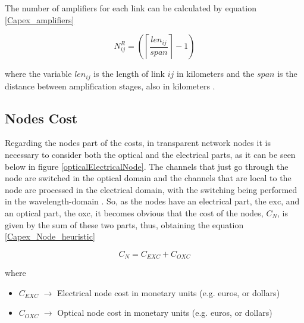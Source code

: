 \vspace{11pt}
The number of amplifiers for each link can be calculated by equation \ref{Capex_amplifiers}

\begin{equation}
N^R_{ij} = \left(\left\lceil\frac{len_{ij}}{span}\right\rceil-1\right)
\label{Capex_amplifiers}
\end{equation}

\vspace{11pt}
\noindent
where the variable $len_{ij}$ is the length of link $ij$ in kilometers and the $span$ is the distance between amplification stages, also in kilometers \cite{anpinto2}.


\subsection{Nodes Cost}
\label{nodesCost_}

Regarding the nodes part of the costs, in transparent network nodes it is necessary to consider both the optical and the electrical parts, as it can be seen below in figure \ref{opticalElectricalNode}. The channels that just go through the node are switched in the optical domain and the channels that are local to the node are processed in the electrical domain, with the switching being performed in the wavelength-domain \cite{anpinto2}. So, as the nodes have an electrical part, the \gls{exc}, and an optical part, the \gls{oxc}, it becomes obvious that the cost of the nodes, $C_N$, is given by the sum of these two parts, thus, obtaining the equation \ref{Capex_Node_heuristic}
\vspace{11pt} 

\begin{equation}
C_N = C_{EXC} + C_{OXC}
\label{Capex_Node_heuristic}
\end{equation}

\noindent
where

\begin{itemize}
\item {$C_{EXC}$        $\rightarrow$   Electrical node cost in monetary units (e.g. euros, or dollars)}
\item {$C_{OXC}$        $\rightarrow$   Optical node cost in monetary units (e.g. euros, or dollars)}
\end{itemize}

